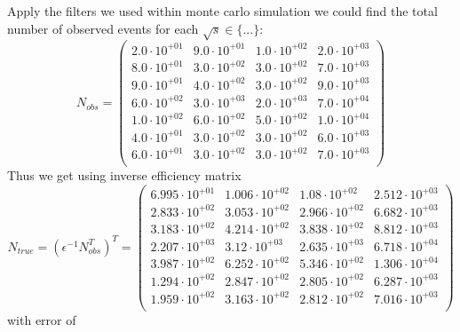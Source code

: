 \documentclass[]{article}
\begin{document}
Apply the filters we used within monte carlo simulation we could find the total number of observed events for each $\sqrt{s} \in \{...\}$:
\begin{equation}
N_{obs}=\begin{pmatrix}
   2.0\cdot 10^{+01} & 9.0\cdot 10^{+01} & 1.0\cdot 10^{+02} & 2.0\cdot 10^{+03} \\
   8.0\cdot 10^{+01} & 3.0\cdot 10^{+02} & 3.0\cdot 10^{+02} & 7.0\cdot 10^{+03} \\
   9.0\cdot 10^{+01} & 4.0\cdot 10^{+02} & 3.0\cdot 10^{+02} & 9.0\cdot 10^{+03} \\
   6.0\cdot 10^{+02} & 3.0\cdot 10^{+03} & 2.0\cdot 10^{+03} & 7.0\cdot 10^{+04} \\
   1.0\cdot 10^{+02} & 6.0\cdot 10^{+02} & 5.0\cdot 10^{+02} & 1.0\cdot 10^{+04} \\
   4.0\cdot 10^{+01} & 3.0\cdot 10^{+02} & 3.0\cdot 10^{+02} & 6.0\cdot 10^{+03} \\
   6.0\cdot 10^{+01} & 3.0\cdot 10^{+02} & 3.0\cdot 10^{+02} & 7.0\cdot 10^{+03} \\
\end{pmatrix}
\end{equation}
Thus we get using inverse efficiency matrix
\begin{equation}
N_{true} = (\epsilon^{-1}N_{obs}^T)^T = \begin{pmatrix}
   6.995\cdot 10^{+01} & 1.006\cdot 10^{+02} & 1.08\cdot 10^{+02} & 2.512\cdot 10^{+03} \\
   2.833\cdot 10^{+02} & 3.053\cdot 10^{+02} & 2.966\cdot 10^{+02} & 6.682\cdot 10^{+03} \\
   3.183\cdot 10^{+02} & 4.214\cdot 10^{+02} & 3.838\cdot 10^{+02} & 8.812\cdot 10^{+03} \\
   2.207\cdot 10^{+03} & 3.12\cdot 10^{+03} & 2.635\cdot 10^{+03} & 6.718\cdot 10^{+04} \\
   3.987\cdot 10^{+02} & 6.252\cdot 10^{+02} & 5.346\cdot 10^{+02} & 1.306\cdot 10^{+04} \\
   1.294\cdot 10^{+02} & 2.847\cdot 10^{+02} & 2.805\cdot 10^{+02} & 6.287\cdot 10^{+03} \\
   1.959\cdot 10^{+02} & 3.163\cdot 10^{+02} & 2.812\cdot 10^{+02} & 7.016\cdot 10^{+03} \\
\end{pmatrix}
\end{equation}
with error of 
\end{document}
